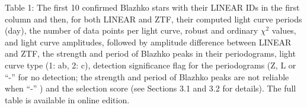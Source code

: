\documentclass[twocolumn, tighten]{aastex631}
\begin{document}
\appendix

Table 1: The first 10 confirmed Blazhko stars with their LINEAR
IDs in the first column and then, for both LINEAR and ZTF, their
computed  light curve periods (day),
the number of data points per light curve, robust and ordinary $\chi^2$ values, and light curve amplitudes, followed by amplitude 
difference between LINEAR and ZTF, the strength and period of Blazhko peaks in their periodograms, light curve type (1: ab, 2: c), detection
significance flag for the periodograms (Z, L or ``-'' for no detection; the strength and period of Blazhko
peaks are not reliable when ``-'' ) and the selection score (see Sections 3.1 and 3.2 for details). The full table is available in online edition.


%



\end{document}
